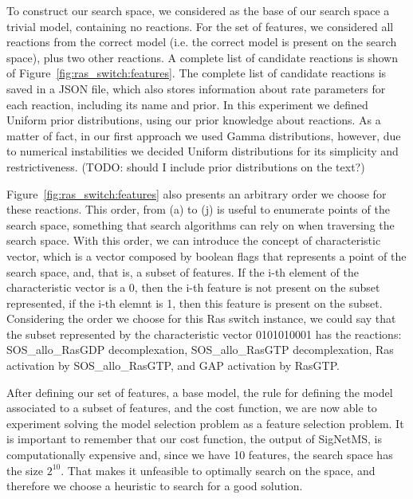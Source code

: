 To construct our search space, we considered as the base of our search
space a trivial model, containing no reactions. For the set of features,
we considered all reactions from the correct model (i.e. the correct
model is present on the search space), plus two other reactions. A
complete list of candidate reactions is shown of
Figure~\ref{fig:ras_switch:features}. The complete list of candidate
reactions is saved in a JSON file, which also stores information about
rate parameters for each reaction, including its name and prior. In this
experiment we defined Uniform prior distributions, using our prior
knowledge about reactions. As a matter of fact, in our first approach we
used Gamma distributions, however, due to numerical instabilities we
decided Uniform distributions for its simplicity and restrictiveness.
({\color{blue}TODO: should I include prior distributions on the text?}) 

Figure~\ref{fig:ras_switch:features} also presents an arbitrary order we
choose for these reactions. This order, from (a) to (j) is useful to
enumerate points of the search space, something that search algorithms
can rely on when traversing the search space. With this order, we can
introduce the concept of characteristic vector, which is a vector
composed by boolean flags that represents a point of the search space,
and, that is, a subset of features. If the i-th element of the
characteristic vector is a 0, then the i-th feature is not present on 
the subset represented, if the i-th elemnt is 1, then this feature is
present on the subset. Considering the order we choose for this Ras
switch instance, we could say that the subset represented by the
characteristic vector 0101010001 has the reactions: SOS\_allo\_RasGDP
decomplexation, SOS\_allo\_RasGTP decomplexation, Ras activation by
SOS\_allo\_RasGTP, and GAP activation by RasGTP.

After defining our set of features, a base model, the rule for 
defining the model associated to a subset of features, and the cost
function, we are now able to experiment solving the model selection
problem as a feature selection problem. It is important to remember that
our cost function, the output of SigNetMS, is computationally expensive
and, since we have 10 features, the search space has the size $2^{10}$.
That makes it unfeasible to optimally search on the space, and therefore
we choose a heuristic to search for a good solution.



